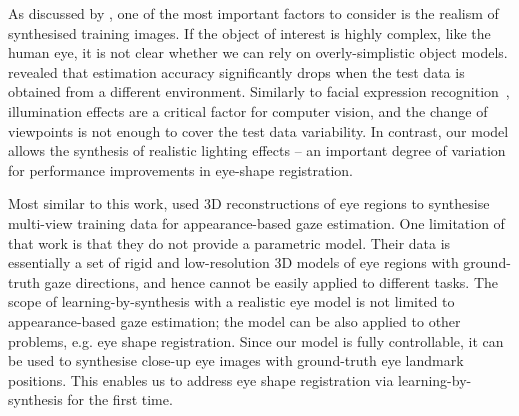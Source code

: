 As discussed by \citet{kaneva2011evaluation}, one of the most important factors to consider is the realism of synthesised training images.
If the object of interest is highly complex, like the human eye, it is not clear whether we can rely on overly-simplistic object models.
\citet{zhang15_cvpr} revealed that estimation accuracy significantly drops when the test data is obtained from a different environment.
Similarly to facial expression recognition~\cite{stratou2011effect}, illumination effects are a critical factor for computer vision, and the change of viewpoints is not enough to cover the test data variability.
In contrast, our model allows the synthesis of realistic lighting effects -- an important degree of variation for performance improvements in eye-shape registration.

Most similar to this work, \citet{sugano2014learning} used 3D reconstructions of eye regions to synthesise multi-view training data for appearance-based gaze estimation.
One limitation of that work is that they do not provide a parametric model.
Their data is essentially a set of rigid and low-resolution 3D models of eye regions with ground-truth gaze directions, and hence cannot be easily applied to different tasks.
The scope of learning-by-synthesis with a realistic eye model is not limited to appearance-based gaze estimation; the model can be also applied to other problems, e.g. eye shape registration.
Since our model is fully controllable, it can be used to synthesise close-up eye images with ground-truth eye landmark positions.
This enables us to address eye shape registration via learning-by-synthesis for the first time.


